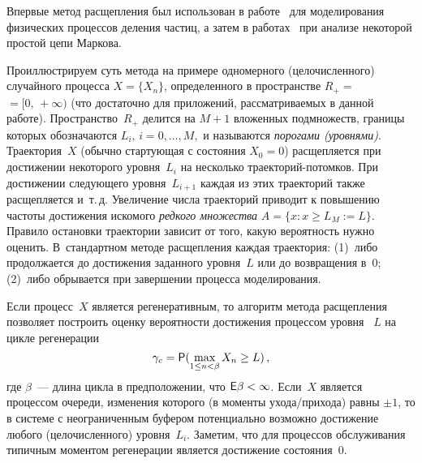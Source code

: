 \begin{multicols}{2}
Впервые метод расщепления был использован   в работе~\cite{KahnHarris51} 
для  моделирования физических процессов деления
частиц, а затем в работах~\cite{Bayes70, Bayes72} при анализе
некоторой простой  цепи Маркова.

Проиллюстрируем суть метода на примере одномерного (целочисленного)
случайного процесса $X=\{X_n\}$, определенного в пространстве
$R_+=$\linebreak $=[0,\,+\infty)$ (что достаточно для  приложений, рассматриваемых
в данной работе). Пространство~$R_+$ делится на $M+1$ вложенных
подмножеств, границы которых обозначаются   $L_i,\,i=0,\ldots,M,$ и
называются \textit{порогами (уровнями)}. Траектория~$X$ (обычно
стартующая с состояния $X_0=0$) расщепляется при достижении
некоторого  уровня~$L_i$ на несколько траекторий-потомков. При
достижении следующего уровня~$L_{i+1}$ каждая из этих траекторий
также расщепляется и~т.\,д. Увеличение числа  траекторий приводит к
повышению частоты достижения искомого  \textit{редкого множества}
$A=\{x:x\ge L_M:=L\}$.  Правило остановки траектории зависит от
того, какую вероятность нужно оценить. В~стандартном методе
расщепления каждая траектория: (1)~либо продолжается до достижения
заданного уровня~$L$ или до возвращения в~0; (2)~либо обрывается при
завершении процесса моделирования.

Если  процесс~$X$ является регенеративным, то алгоритм метода
расщепления позволяет построить оценку вероятности достижения
процессом уровня~ $L$ на цикле регенерации
\begin{equation}
\gamma_c= {\sf P} (\max_{1 \le n < \beta} X_n \ge L )\,,
 \label{gamma_c}
\end{equation}
где $\beta$~--- длина цикла в предположении, что ${\sf E} \beta < \infty$.
Если~$X$ является процессом очереди, изменения которого (в моменты
ухода/прихода) равны $\pm 1$, то в системе с неограниченным буфером
потенциально возможно  достижение любого (целочисленного) уровня~$L_i$.
 Заметим, что для процессов обслуживания  типичным моментом
регенерации является достижение состояния~$0$.


\end{multicols}
